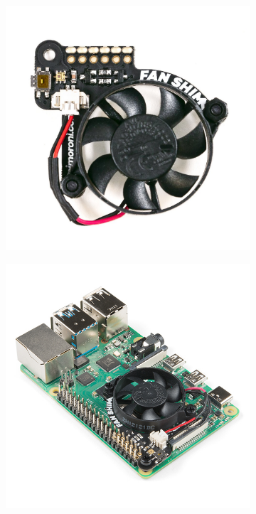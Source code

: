 \documentclass[../Head/report.tex]{subfiles}
\begin{document}
\begin{figure}[H]
    \centering
    \begin{subfigure}[b]{.13\textwidth}
        \centering
        \includegraphics[width=1\linewidth]{../Figures/raspberry_pi/fan-shim.jpg}
        \vspace{0.1em}
        \caption{}
        \label{fig:raspberry_pi_shim_fan}
    \end{subfigure}
     \hspace{0.5em}
    \begin{subfigure}[b]{.25\textwidth}
        \centering
        \includegraphics[width=1\linewidth]{../Figures/raspberry_pi/raspberry_pi.jpg}

\end{subfigure}
\end{figure}
\end{document}
